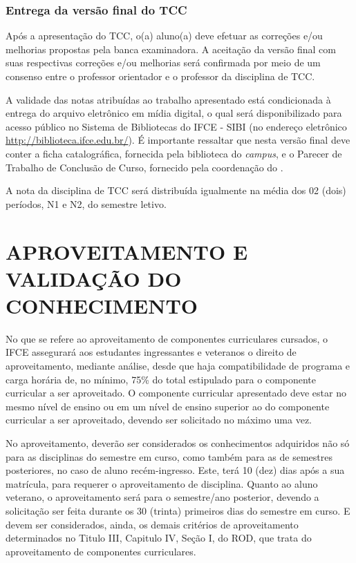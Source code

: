 \documentclass{paper}
\def\web#1{\href{#1}{#1}}
\begin{document}
\subsubsection{Entrega da versão final do TCC}

Após a apresentação do TCC, o(a) aluno(a) deve efetuar as correções e/ou melhorias propostas pela banca examinadora. A aceitação da versão final com suas respectivas correções e/ou melhorias será confirmada por meio de um consenso entre o professor orientador e o professor da disciplina de TCC.

A validade das notas atribuídas ao trabalho apresentado está condicionada à entrega %
do arquivo eletrônico em mídia digital, o qual será disponibilizado para acesso público no Sistema de Bibliotecas do IFCE - SIBI (no endereço eletrônico \web{http://biblioteca.ifce.edu.br/}). É importante ressaltar que nesta versão final deve conter a ficha catalográfica, fornecida pela biblioteca do \textit{campus}, e o Parecer de Trabalho de Conclusão de Curso, fornecido pela coordenação do \NOMECURSO.

A nota da disciplina de TCC será distribuída igualmente na média dos 02 (dois) períodos, N1 e N2, do semestre letivo.


\clearpage
\section{APROVEITAMENTO E VALIDAÇÃO DO CONHECIMENTO}

No que se refere ao aproveitamento de componentes curriculares cursados, o IFCE assegurará aos estudantes ingressantes e veteranos o direito de aproveitamento, mediante análise, desde que haja compatibilidade de programa e carga horária de, no mínimo, 75\% do total estipulado para o componente curricular a ser aproveitado. O componente curricular apresentado deve estar no mesmo nível de ensino ou em um nível de ensino superior ao do componente curricular a ser aproveitado, devendo ser solicitado no máximo uma vez. 

No aproveitamento, deverão ser considerados os conhecimentos adquiridos não só para as disciplinas do semestre em curso, como também para as de semestres posteriores, no caso de aluno recém-ingresso. Este, terá 10 (dez) dias após a sua matrícula, para requerer o aproveitamento de disciplina. Quanto ao aluno veterano, o aproveitamento será para o semestre/ano posterior, devendo a solicitação ser feita durante os 30 (trinta) primeiros dias do semestre em curso. E devem ser considerados, ainda, os demais critérios de aproveitamento determinados no Titulo III, Capitulo IV, Seção I, do ROD, que trata do aproveitamento de componentes curriculares.
\end{document}
